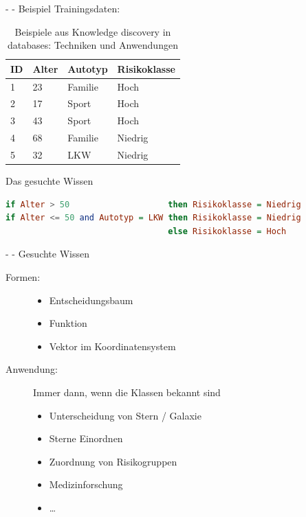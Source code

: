 \documentclass[fleqn,11pt,aspectratio=43]{beamer}
\begin{document}
\begin{frame}[fragile]{\insertsectionhead - \insertsubsectionhead - Beispiel \cite{ester2000knowledge}}
Trainingsdaten:
\begin{table}
\begin{tabular}{|p{2cm}|p{2cm}|p{2cm}|p{2cm}|}\hline
ID 	& Alter	& Autotyp	& Risikoklasse \\\hline \hline
1	& 23	& Familie	& Hoch\\
2	& 17	& Sport		& Hoch\\
3	& 43	& Sport		& Hoch\\
4	& 68	& Familie	& Niedrig\\
5	& 32	& LKW		& Niedrig \\\hline
\end{tabular}
\caption{Beispiele aus Knowledge discovery in databases: Techniken und Anwendungen \cite{ester2000knowledge}}
\end{table}
\pause
Das gesuchte Wissen
\begin{lstlisting}[language=Haskell]
if Alter > 50                    then Risikoklasse = Niedrig
if Alter <= 50 and Autotyp = LKW then Risikoklasse = Niedrig
                                 else Risikoklasse = Hoch
\end{lstlisting}
\end{frame}

\begin{frame}{\insertsectionhead - \insertsubsectionhead - Gesuchte Wissen \cite{ester2000knowledge}}
\begin{description}
\item[Formen:]
\begin{itemize}
\item Entscheidungsbaum %
\item Funktion %
\item Vektor im Koordinatensystem
\end{itemize}
\item[Anwendung:] Immer dann, wenn die Klassen bekannt sind
\begin{itemize}
\item Unterscheidung von Stern / Galaxie
\item Sterne Einordnen
\item Zuordnung von Risikogruppen
\item Medizinforschung
\item \dots
\end{itemize}
\end{description}
\end{frame}
\end{document}
